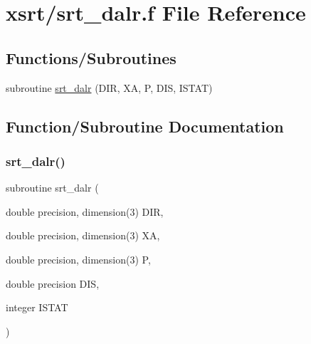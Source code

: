 \hypertarget{srt__dalr_8f}{}\section{xsrt/srt\+\_\+dalr.f File Reference}
\label{srt__dalr_8f}
\subsection*{Functions/\+Subroutines}
\begin{DoxyCompactItemize}
\item 
subroutine \hyperlink{srt__dalr_8f_a8be993e98d8b697ddca6c7fca266c06b}{srt\+\_\+dalr} (D\+IR, XA, P, D\+IS, I\+S\+T\+AT)
\end{DoxyCompactItemize}


\subsection{Function/\+Subroutine Documentation}
\mbox{\label{srt__dalr_8f_a8be993e98d8b697ddca6c7fca266c06b}} 
\subsubsection{\texorpdfstring{srt\+\_\+dalr()}{srt\_dalr()}}
{\footnotesize\ttfamily subroutine srt\+\_\+dalr (\begin{DoxyParamCaption}\item[{double precision, dimension(3)}]{D\+IR,  }\item[{double precision, dimension(3)}]{XA,  }\item[{double precision, dimension(3)}]{P,  }\item[{double precision}]{D\+IS,  }\item[{integer}]{I\+S\+T\+AT }\end{DoxyParamCaption})}

